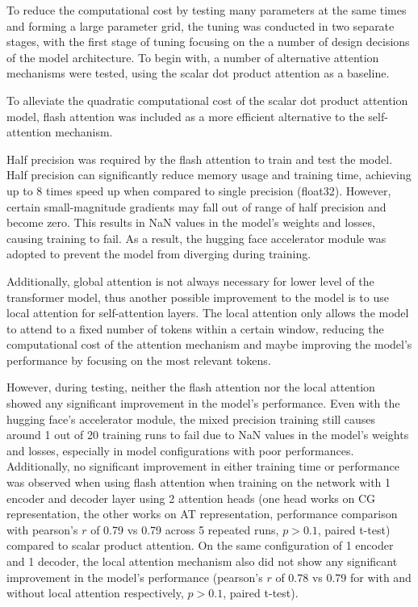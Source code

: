 To reduce the computational cost by testing many parameters at the same times and forming a large parameter grid, the tuning was conducted in two separate stages, with the first stage of tuning focusing on the a number of design decisions of the model architecture. To begin with, a number of alternative attention mechanisms were tested, using the scalar dot product attention as a baseline. 

To alleviate the quadratic computational cost of the scalar dot product attention model, flash attention was included as a more efficient alternative to the self-attention mechanism. 

Half precision was required by the flash attention to train and test the model. Half precision can significantly reduce memory usage and training time, achieving up to 8 times speed up when compared to single precision (float32)\cite{micikeviciusMixedPrecisionTraining2018}. However, certain small-magnitude gradients may fall out of range of half precision and become zero. This results in NaN values in the model's weights and losses, causing training to fail. As a result, the hugging face accelerator module was adopted to prevent the model from diverging during training. 

Additionally, global attention is not always necessary for lower level of the transformer model\cite{raeTransformersNeedDeep2020}, thus another 
possible improvement to the model is to use local attention for self-attention layers. The local attention only allows the model to attend to a fixed number of tokens within a certain window, reducing the computational cost of the attention mechanism and maybe improving the model's performance by focusing on the most relevant tokens.

However, during testing, neither the flash attention nor the local attention showed any significant improvement in the model's performance. Even with the hugging face's accelerator module, the mixed precision training still causes around 1 out of 20 training runs to fail due to NaN values in the model's weights and losses, especially in model configurations with poor performances. Additionally, no significant improvement in either training time or performance was observed when using flash attention when training on the network with 1 encoder and decoder layer using 2 attention heads (one head works on CG representation, the other works on AT representation, performance comparison with pearson's $r$ of 0.79 vs 0.79 across 5 repeated runs, $p>0.1$, paired t-test) compared to scalar product attention. On the same configuration of 1 encoder and 1 decoder, the local attention mechanism also did not show any significant improvement in the model's performance (pearson's $r$ of 0.78 vs 0.79 for with and without local attention respectively, $p>0.1$, paired t-test).

